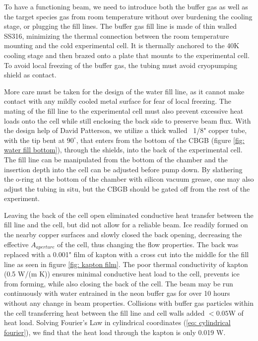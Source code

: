 To have a functioning beam, we need to introduce both the buffer gas as well as the target species gas from room temperature without over burdening the cooling stage, or plugging the fill lines. The buffer gas fill line is made of thin walled SS316, minimizing the thermal connection between the room temperature mounting and the cold experimental cell. It is thermally anchored to the 40K cooling stage and then brazed onto a plate that mounts to the experimental cell. To avoid local freezing of the buffer gas, the tubing must avoid cryopumping shield as contact.

More care must be taken for the design of the water fill line, as it cannot make contact with any mildly cooled metal surface for fear of local freezing. The mating of the fill line to the experimental cell must also prevent excessive heat loads onto the cell while still enclosing the back side to preserve beam flux. With the design help of David Patterson, we utilize a thick walled ~1/8" copper tube, with the tip bent at $90^\circ$, that enters from the bottom of the CBGB (figure \ref{fig: water fill bottom}), through the shields, into the back of the experimental cell. The fill line can be manipulated from the bottom of the chamber and the insertion depth into the cell can be adjusted before pump down. By slathering the o-ring at the bottom of the chamber with silicon vacuum grease, one may also adjust the tubing in situ, but the CBGB should be gated off from the rest of the experiment.

Leaving the back of the cell open eliminated conductive heat transfer between the fill line and the cell, but did not allow for a reliable beam. Ice readily formed on the nearby copper surfaces and slowly closed the back opening, decreasing the effective $A_{aperture}$ of the cell, thus changing the flow properties. The back was replaced with a 0.001" film of kapton with a cross cut into the middle for the fill line as seen in figure \ref{fig: kapton film}. The poor thermal conductivity of kapton (0.5 W/(m K)) ensures minimal conductive heat load to the cell, prevents ice from forming, while also closing the back of the cell. The beam may be run continuously with water entrained in the neon buffer gas for over 10 hours without any change in beam properties. Collisions with buffer gas particles within the cell transferring heat between the fill line and cell walls added $<0.05$W of heat load. Solving Fourier's Law in cylindrical coordinates (\ref{eq: cylindrical fourier}), we find that the heat load through the kapton is only 0.019 W.

